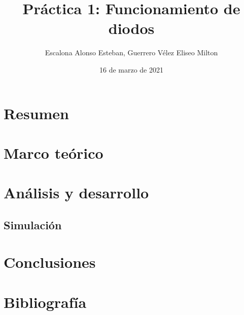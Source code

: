 \documentclass[letter]{revtex4}
\begin{document}
\title{Práctica 1: Funcionamiento de diodos}
\author{Escalona Alonso Esteban, Guerrero Vélez Eliseo Milton}

\date{16 de marzo de 2021}
\maketitle


\section{Resumen}

\clearpage 

\section{Marco teórico}

\clearpage

\section{Análisis y desarrollo}

\clearpage

\subsection{Simulación}

\clearpage

\section{Conclusiones}

\clearpage

\section{Bibliografía}
\end{document}
